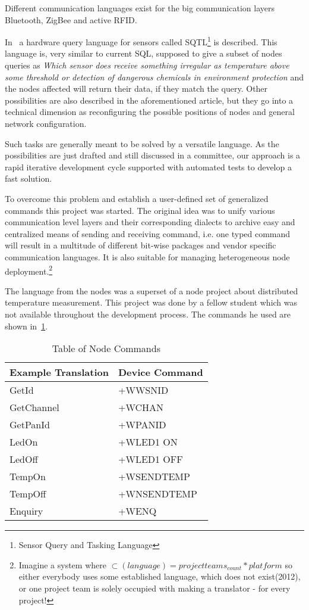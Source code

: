 Different communication languages exist for the big communication layers Bluetooth, ZigBee and active RFID.

In~\cite[p. 407]{Akyildiz02wirelesssensor} a hardware query language for sensors called \textsc{SQTL}\footnote{Sensor Query and Tasking Language}
is described. This language is, very similar to current \textsc{SQL}, supposed to give a subset of nodes queries as \textit{Which sensor does receive
something irregular as temperature above some threshold or detection of dangerous chemicals in environment protection} and the nodes affected 
will return their data, if they match the query. Other possibilities are also described in the aforementioned article, but they go into a technical
dimension as reconfiguring the possible positions of nodes and general network configuration.

Such tasks are generally meant to be solved by a versatile language. As the possibilities are just drafted and still discussed in a committee, our 
approach is a rapid iterative development cycle supported with automated tests to develop a fast solution.

To overcome this problem and establish a user-defined set of generalized commands this project was started.
The original idea was to unify various communication level layers and their corresponding dialects to 
archive easy and centralized means of sending and receiving command, i.e. one typed command will result in 
a multitude of different bit-wise packages and vendor specific communication languages.
It is also suitable for managing heterogeneous node deployment.\footnote{Imagine a system where \(\subset(language)=project teams_{count} * platform \) 
so either everybody uses some established language, which does not exist(2012), or one project team is solely occupied with 
making a translator - for every project!}

The language from the nodes was a superset of a node project about distributed temperature measurement. This project was done by 
a fellow student which was not available throughout the development process. The commands he used are shown in~\ref{tab:nodecommands}.

\begin{table}[!h] 
\centering 
\begin{tabular}{|l||l|} 
Example Translation & Device Command \\ 
\hline
GetId & +WWSNID \\
GetChannel & +WCHAN \\
GetPanId & +WPANID \\
LedOn & +WLED1 ON \\
LedOff & +WLED1 OFF \\
TempOn & +WSENDTEMP \\
TempOff & +WNSENDTEMP \\
Enquiry & +WENQ \\
\end{tabular} 
\caption{ Table of Node Commands} 
\label{tab:nodecommands} 
\end{table}

